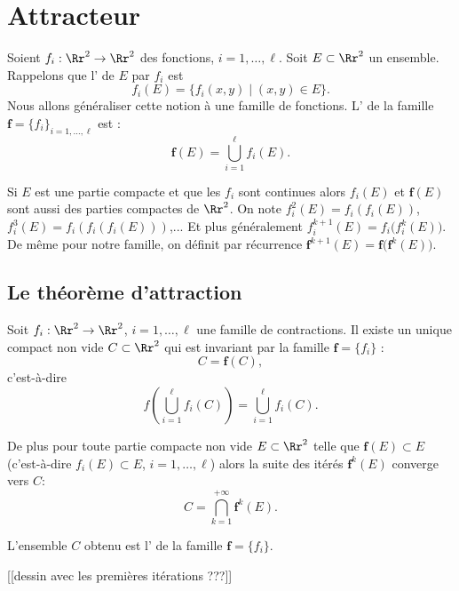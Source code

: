 \documentclass[11pt,class=report,crop=false]{standalone}
\begin{document}
\section{Attracteur}

Soient $f_i : \Rr^2 \to \Rr^2$ des fonctions, $i=1,\ldots,\ell$. 
Soit $E \subset \Rr^2$ un ensemble.
Rappelons que l' de $E$ par $f_i$ est
$$f_i(E) =\big\{ f_i(x,y) \mid (x,y) \in E \big\}.$$
Nous allons généraliser cette notion à une famille de fonctions. 
L' de la famille 
$\mathbf{f}=\{f_i\}_{i=1,\ldots,\ell}$ est :
$$\mathbf{f}(E) = \bigcup_{i=1}^{\ell} f_i(E).$$

Si $E$ est une partie compacte et que les $f_i$ sont continues alors $f_i(E)$
et $\mathbf{f}(E)$ sont aussi des parties compactes de $\Rr^2$.
On note $f_i^2(E) = f_i(f_i(E))$, $f_i^3(E) = f_i(f_i(f_i(E)))$,...
Et plus généralement $f_i^{k+1}(E) = f_i \big(f_i^k(E)\big)$.
De même pour notre famille, on définit par récurrence
 $\mathbf{f}^{k+1}(E) = \mathbf{f} \big( \mathbf{f}^k(E)\big)$.

\subsection{Le théorème d'attraction}


\begin{theoreme}
\label{th:attraction}
Soit $f_i : \Rr^2 \to \Rr^2$, $i=1,\ldots,\ell$ une famille de contractions.
Il existe un unique compact non vide $C \subset \Rr^2$ qui est invariant par la famille
$\mathbf{f} = \{f_i\}$ :
$$C= \mathbf{f}(C),$$
c'est-à-dire $$f\left(\bigcup_{i=1}^{\ell} f_i(C) \right) = \bigcup_{i=1}^{\ell} f_i(C).$$

De plus pour toute partie compacte non vide $E \subset \Rr^2$ telle que 
$\mathbf{f}(E) \subset E$ (c'est-à-dire $f_i(E) \subset E$, $i=1,\ldots,\ell$)
alors la suite des itérés 
$\mathbf{f}^k(E)$ converge vers $C$:
$$C = \bigcap_{k=1}^{+\infty} \mathbf{f}^k(E).$$
\end{theoreme}



L'ensemble $C$ obtenu est l' de la famille
$\mathbf{f}=\{f_i\}$.

[[dessin avec les premières itérations ???]]
\end{document}

